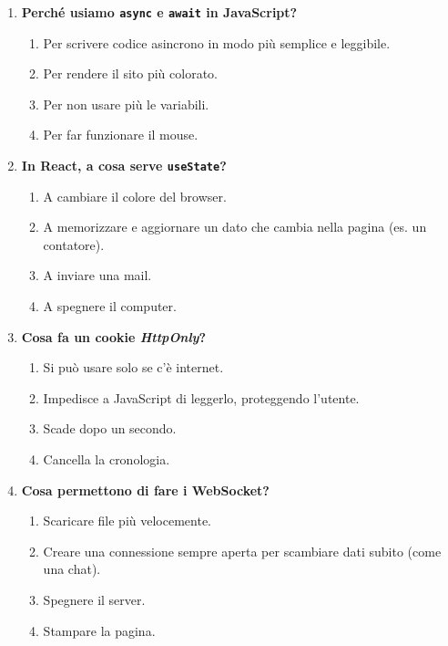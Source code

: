 \documentclass[11pt,a4paper]{article}
\begin{document}
\begin{enumerate}[label=\textbf{\arabic*.}, leftmargin=1.5em, itemsep=1.5em]
    \item \textbf{Perché usiamo \texttt{async} e \texttt{await} in JavaScript?}
    \begin{enumerate}[label=\alph*)]
        \item Per scrivere codice asincrono in modo più semplice e leggibile.
        \item Per rendere il sito più colorato.
        \item Per non usare più le variabili.
        \item Per far funzionare il mouse.
    \end{enumerate}

    \item \textbf{In React, a cosa serve \texttt{useState}?}
    \begin{enumerate}[label=\alph*)]
        \item A cambiare il colore del browser.
        \item A memorizzare e aggiornare un dato che cambia nella pagina (es. un contatore).
        \item A inviare una mail.
        \item A spegnere il computer.
    \end{enumerate}

    \item \textbf{Cosa fa un cookie \textit{HttpOnly}?}
    \begin{enumerate}[label=\alph*)]
        \item Si può usare solo se c'è internet.
        \item Impedisce a JavaScript di leggerlo, proteggendo l'utente.
        \item Scade dopo un secondo.
        \item Cancella la cronologia.
    \end{enumerate}

    \item \textbf{Cosa permettono di fare i WebSocket?}
    \begin{enumerate}[label=\alph*)]
        \item Scaricare file più velocemente.
        \item Creare una connessione sempre aperta per scambiare dati subito (come una chat).
        \item Spegnere il server.
        \item Stampare la pagina.
    \end{enumerate}


\end{enumerate}
\end{document}
